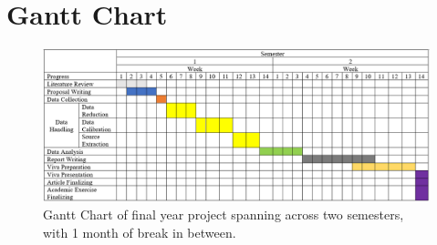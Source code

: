 \documentclass{article}
\begin{document}
\section{Gantt Chart}
\begin{figure}[h]
    \centering
    \includegraphics[width=150mm]{gantt chart.png}
    \caption{Gantt Chart of final year project spanning across two semesters, with 1 month of break in between.}
    \label{fig:ganttchart}
\end{figure}

\printbibliography
\end{document}

